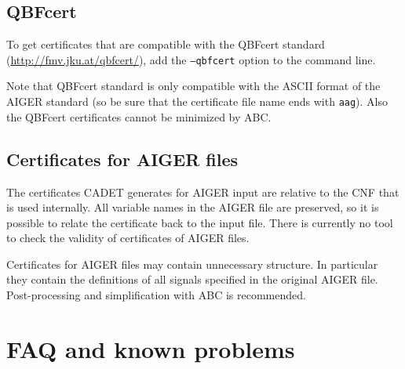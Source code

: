 \documentclass{article}
\begin{document}
\subsection{QBFcert}
To get certificates that are compatible with the QBFcert standard (\url{http://fmv.jku.at/qbfcert/}), add the \texttt{--qbfcert} option to the command line.

Note that QBFcert standard is only compatible with the ASCII format of the AIGER standard (so be sure that the certificate file name ends with \texttt{aag}). 
Also the QBFcert certificates cannot be minimized by ABC. 

\subsection{Certificates for AIGER files}
The certificates CADET generates for AIGER input are relative to the CNF that is used internally. 
All variable names in the AIGER file are preserved, so it is possible to relate the certificate back to the input file. 
There is currently no tool to check the validity of certificates of AIGER files. 

Certificates for AIGER files may contain unnecessary structure. 
In particular they contain the definitions of all signals specified in the original AIGER file. 
Post-processing and simplification with ABC is recommended. 


\section{FAQ and known problems}
\end{document}
